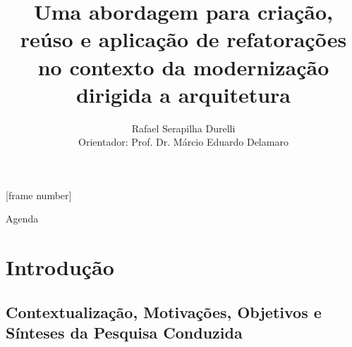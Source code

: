 \documentclass{beamer}
\title{Uma abordagem para criação, reúso e aplicação de refatorações no contexto da modernização dirigida a arquitetura}
\date{}
\author{Rafael Serapilha Durelli\\Orientador: Prof. Dr. Márcio Eduardo Delamaro}
\institute{USP - ICMC\\
\Letter\{rdurelli, delamaro\}@icmc.usp.br
}
\begin{document}
 

[frame number]

\frame[label=firstslide]{\maketitle}


\begin{frame}{Agenda}
\tableofcontents
\end{frame}


\section{Introdução}
\label{sec:introducao}

\subsection{Contextualização, Motivações, Objetivos e Sínteses da Pesquisa Conduzida}

\end{document}
